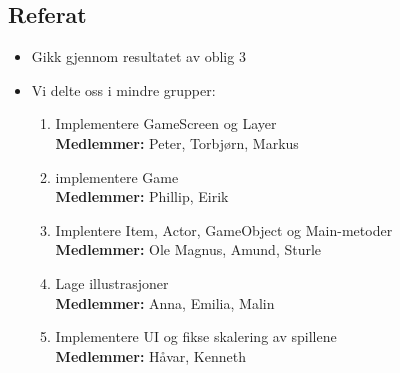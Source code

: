 \documentclass[11pt]{meetingmins}
\begin{document}
\maketitle
\subsection{Referat}

\begin{itemize}
\item Gikk gjennom resultatet av oblig 3
\item Vi delte oss i mindre grupper:
\begin{enumerate}

\item Implementere GameScreen og Layer \\
\textbf{Medlemmer:} Peter, Torbj{\o}rn, Markus

\item implementere Game \\
\textbf{Medlemmer:} Phillip, Eirik

\item Implentere Item, Actor, GameObject og Main-metoder \\
\textbf{Medlemmer:} Ole Magnus, Amund, Sturle

\item Lage illustrasjoner \\
\textbf{Medlemmer:} Anna, Emilia, Malin

\item Implementere UI og fikse skalering av spillene\\
\textbf{Medlemmer:} H{\aa}var, Kenneth

\end{enumerate}
\end{itemize}

%
%

\end{document}
